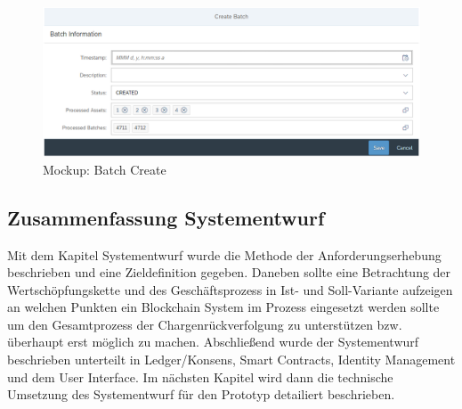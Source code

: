 \begin{figure}[H]
	\centering
	\includegraphics[width=1\linewidth]{pictures/ui-create-batch}
	\caption[Mockup: Batch Create]{Mockup: Batch Create}
	\label{fig:ui-create-batch}
\end{figure}




\subsection{Zusammenfassung Systementwurf}

Mit dem Kapitel Systementwurf wurde die Methode der Anforderungserhebung beschrieben und eine Zieldefinition gegeben. Daneben sollte eine Betrachtung der Wertschöpfungskette und des Geschäftsprozess in Ist- und Soll-Variante aufzeigen an welchen Punkten ein Blockchain System im Prozess eingesetzt werden sollte um den Gesamtprozess der Chargenrückverfolgung zu unterstützen bzw. überhaupt erst möglich zu machen. Abschließend wurde der Systementwurf beschrieben unterteilt in Ledger/Konsens, Smart Contracts, Identity Management und dem User Interface. Im nächsten Kapitel wird dann die technische Umsetzung des Systementwurf für den Prototyp detailiert beschrieben.

\newpage

